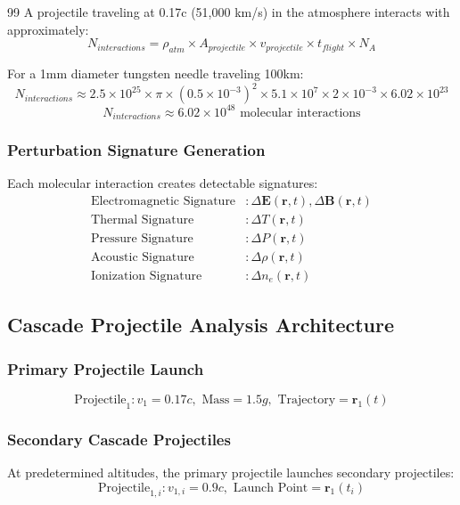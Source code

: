 \documentclass[12pt,a4paper]{article}
\begin{document}
\begin{thebibliography}{99}
A projectile traveling at 0.17c (51,000 km/s) in the atmosphere interacts with approximately:
\begin{equation}
N_{interactions} = \rho_{atm} \times A_{projectile} \times v_{projectile} \times t_{flight} \times N_A
\end{equation}

For a 1mm diameter tungsten needle traveling 100km:
\begin{equation}
N_{interactions} \approx 2.5 \times 10^{25} \times \pi \times (0.5 \times 10^{-3})^2 \times 5.1 \times 10^7 \times 2 \times 10^{-3} \times 6.02 \times 10^{23}
\end{equation}
\begin{equation}
N_{interactions} \approx 6.02 \times 10^{48} \text{ molecular interactions}
\end{equation}

\subsubsection{Perturbation Signature Generation}

Each molecular interaction creates detectable signatures:
\begin{align}
\text{Electromagnetic Signature} &: \Delta \mathbf{E}(\mathbf{r},t), \Delta \mathbf{B}(\mathbf{r},t) \\
\text{Thermal Signature} &: \Delta T(\mathbf{r},t) \\
\text{Pressure Signature} &: \Delta P(\mathbf{r},t) \\
\text{Acoustic Signature} &: \Delta \rho(\mathbf{r},t) \\
\text{Ionization Signature} &: \Delta n_e(\mathbf{r},t)
\end{align}

\subsection{Cascade Projectile Analysis Architecture}

\subsubsection{Primary Projectile Launch}
\begin{equation}
\text{Projectile}_1: v_1 = 0.17c, \text{ Mass} = 1.5g, \text{ Trajectory} = \mathbf{r}_1(t)
\end{equation}

\subsubsection{Secondary Cascade Projectiles}
At predetermined altitudes, the primary projectile launches secondary projectiles:
\begin{equation}
\text{Projectile}_{1,i}: v_{1,i} = 0.9c, \text{ Launch Point} = \mathbf{r}_1(t_i)
\end{equation}


\end{thebibliography}
\end{document}
